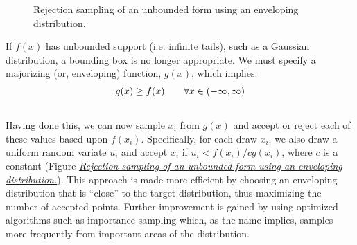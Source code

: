 \documentclass[letterpaper,10pt,english]{sphinxmanual}
\begin{document}
\begin{figure}[htbp]
\centering
\capstart

\caption{Rejection sampling of an unbounded form using an enveloping distribution.}\label{theory:envelope}\end{figure}

If $f(x)$ has unbounded support (i.e. infinite tails), such as a Gaussian distribution, a bounding box is no longer appropriate. We must specify a majorizing (or, enveloping) function, $g(x)$, which implies:
\begin{gather}
\begin{split}g(x) \ge  f(x) \qquad\forall x \in (-\infty,\infty)\end{split}\notag\\\begin{split}\end{split}\notag
\end{gather}
Having done this, we can now sample ${x_i}$ from $g(x)$ and accept or reject each of these values based upon $f(x_i)$. Specifically, for each draw $x_i$, we also draw a uniform random variate $u_i$ and accept $x_i$ if $u_i < f(x_i)/cg(x_i)$, where $c$ is a constant (Figure {\hyperref[theory:envelope]{\emph{Rejection sampling of an unbounded form using an enveloping distribution.}}}). This approach is made more efficient by choosing an enveloping distribution that is ``close'' to the target distribution, thus maximizing the number of accepted points. Further improvement is gained by using optimized algorithms such as importance sampling which, as the name implies, samples more frequently from important areas of the distribution.
\end{document}
